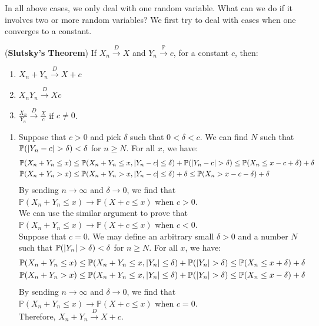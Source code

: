 \documentclass{huhtakm-template-book}
\newcommand{\prob}{\mathbb{P}}
\begin{document}
\newpage
In all above cases, we only deal with one random variable. What can we do if it involves two or more random variables? We first try to deal with cases when one converges to a constant.
\begin{thm}(\textbf{Slutsky's Theorem})
	If $X_{n}\xrightarrow{D}X$ and $Y_{n}\xrightarrow{\prob}c$, for a constant $c$, then:
	\begin{enumerate}
		\item $X_{n}+Y_{n}\xrightarrow{D}X+c$
		\item $X_{n}Y_{n}\xrightarrow{D}Xc$
		\item $\frac{X_{n}}{Y_{n}}\xrightarrow{D}\frac{X}{c}$ if $c\neq 0$.
	\end{enumerate}
\end{thm}
\begin{proofing}
	\begin{enumerate}
		\item Suppose that $c>0$ and pick $\delta$ such that $0<\delta<c$. We can find $N$ such that $\prob(\abs{Y_{n}-c}>\delta)<\delta$ for $n\geq N$. For all $x$, we have:
		\begin{align*}
			\prob(X_{n}+Y_{n}\leq x)&\leq\prob(X_{n}+Y_{n}\leq x,\abs{Y_{n}-c}\leq\delta)+\prob(\abs{Y_{n}-c}>\delta)\leq\prob(X_{n}\leq x-c+\delta)+\delta\\
			\prob(X_{n}+Y_{n}>x)&\leq\prob(X_{n}+Y_{n}>x,\abs{Y_{n}-c}\leq\delta)+\delta\leq\prob(X_{n}>x-c-\delta)+\delta
		\end{align*}
		By sending $n\to\infty$ and $\delta\to 0$, we find that $\prob(X_{n}+Y_{n}\leq x)\to\prob(X+c\leq x)$ when $c>0$.\\
		We can use the similar argument to prove that $\prob(X_{n}+Y_{n}\leq x)\to\prob(X+c\leq x)$ when $c<0$.\\
		Suppose that $c=0$. We may define an arbitrary small $\delta>0$ and a number $N$ such that $\prob(\abs{Y_{n}}>\delta)<\delta$ for $n\geq N$. For all $x$, we have:
		\begin{align*}
			\prob(X_{n}+Y_{n}\leq x)&\leq\prob(X_{n}+Y_{n}\leq x,\abs{Y_{n}}\leq\delta)+\prob(\abs{Y_{n}}>\delta)\leq\prob(X_{n}\leq x+\delta)+\delta\\
			\prob(X_{n}+Y_{n}>x)&\leq\prob(X_{n}+Y_{n}\leq x,\abs{Y_{n}}\leq\delta)+\prob(\abs{Y_{n}}>\delta)\leq\prob(X_{n}\leq x-\delta)+\delta
		\end{align*}
		By sending $n\to\infty$ and $\delta\to 0$, we find that $\prob(X_{n}+Y_{n}\leq x)\to\prob(X+c\leq x)$ when $c=0$.\\
		Therefore, $X_{n}+Y_{n}\xrightarrow{D}X+c$.

\end{enumerate}
\end{proofing}
\end{document}
